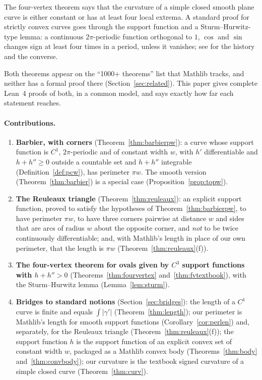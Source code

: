 \documentclass[11pt]{article}
\theoremstyle{definition}
\theoremstyle{remark}
\begin{document}
The four-vertex theorem \cite{mukhopadhyaya1909,kneser1912} says that the
curvature of a simple closed smooth plane curve is either constant or has at least four local
extrema. A standard proof for strictly convex curves goes through the support function and a
Sturm--Hurwitz-type lemma: a continuous $2\pi$-periodic function orthogonal to $1$, $\cos$ and $\sin$
changes sign at least four times in a period, unless it vanishes; see \cite{osserman1985,gluck1971,deturck2007} for the history and the converse.

Both theorems appear on the ``1000+ theorems'' list that Mathlib tracks, and neither has a formal
proof there (Section~\ref{sec:related}). This paper gives complete Lean~4 proofs of both, in a
common model, and says exactly how far each statement reaches.

\paragraph{Contributions.}
\begin{enumerate}
\item \textbf{Barbier, with corners} (Theorem~\ref{thm:barbierpw}): a curve whose support function is
$C^1$, $2\pi$-periodic and of constant width $w$, with $h'$ differentiable and $h+h''\ge 0$ outside a
countable set and $h+h''$ integrable (Definition~\ref{def:pcw}), has
perimeter $\pi w$. The smooth version (Theorem~\ref{thm:barbier}) is a special case
(Proposition~\ref{prop:topw}).
\item \textbf{The Reuleaux triangle} (Theorem~\ref{thm:reuleaux}): an explicit support function,
proved to satisfy the hypotheses of Theorem~\ref{thm:barbierpw}, to have perimeter $\pi w$, to have
three corners pairwise at distance $w$ and sides that are arcs of radius $w$ about the opposite
corner, and \emph{not} to be twice continuously differentiable; and, with Mathlib's length in
place of our own perimeter, that the length is $\pi w$ (Theorem~\ref{thm:reuleaux}(f)).
\item \textbf{The four-vertex theorem for ovals given by $C^3$ support functions with $h+h''>0$}
(Theorems~\ref{thm:fourvertex} and~\ref{thm:fvtextbook}), with the Sturm--Hurwitz lemma
(Lemma~\ref{lem:sturm}).
\item \textbf{Bridges to standard notions} (Section~\ref{sec:bridges}): the length of a $C^1$ curve
is finite and equals $\int\lvert\gamma'\rvert$ (Theorem~\ref{thm:length}); our perimeter is
Mathlib's length for smooth support functions (Corollary~\ref{cor:perlen}) and, separately, for the
Reuleaux triangle (Theorem~\ref{thm:reuleaux}(f)); the support function $h$ is the support function of
an explicit convex set of constant width $w$, packaged as a Mathlib convex body
(Theorems~\ref{thm:body} and~\ref{thm:convbody}); our curvature is the
textbook signed curvature of a simple closed curve (Theorem~\ref{thm:curv}).
\end{enumerate}
\end{document}
